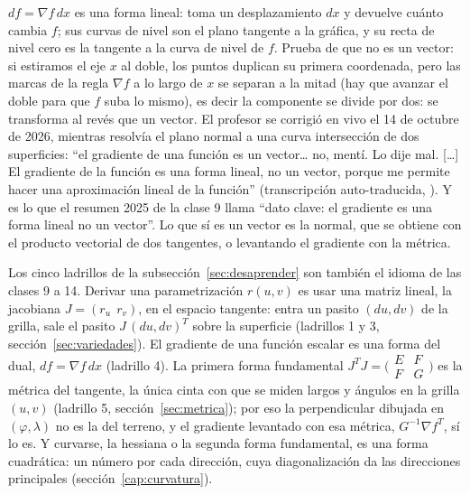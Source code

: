 \begin{atencion}
\(df=\nabla f\,dx\) es una forma lineal: toma un desplazamiento \(dx\) y devuelve cuánto
cambia \(f\); sus curvas de nivel son el plano tangente a la gráfica, y su recta de nivel
cero es la tangente a la curva de nivel de \(f\). Prueba de que no es un vector: si
estiramos el eje \(x\) al doble, los puntos duplican su primera coordenada, pero las marcas
de la regla \(\nabla f\) a lo largo de \(x\) se separan a la mitad (hay que avanzar el
doble para que \(f\) suba lo mismo), es decir la componente se divide por dos: se
transforma al revés que un vector. El profesor se corrigió en vivo el 14 de octubre de
2026, mientras resolvía el plano normal a una curva intersección de dos superficies: ``el
gradiente de una función es un vector\ldots{} no, mentí. Lo dije mal. [\ldots] El gradiente
de la función es una forma lineal, no un vector, porque me permite hacer una aproximación
lineal de la función'' (transcripción auto-traducida, ).
Y es lo que el resumen 2025 de la clase 9 llama ``dato clave: el gradiente es una forma
lineal no un vector''. Lo que sí es un vector es la normal, que se obtiene con el producto
vectorial de dos tangentes, o levantando el gradiente con la métrica.
\end{atencion}

\begin{resultado}
Los cinco ladrillos de la subsección~\ref{sec:desaprender} son también el idioma de las
clases 9 a 14. Derivar una parametrización \(r(u,v)\) es usar una matriz lineal, la
jacobiana \(J=(r_u\ \ r_v)\), en el espacio tangente: entra un pasito \((du,dv)\) de la
grilla, sale el pasito \(J\,(du,dv)^T\) sobre la superficie (ladrillos 1 y 3,
sección~\ref{sec:variedades}). El gradiente de una función escalar es una forma del dual,
\(df=\nabla f\,dx\) (ladrillo 4). La primera forma fundamental \(J^TJ=
\bigl(\begin{smallmatrix}E&F\\ F&G\end{smallmatrix}\bigr)\) es la métrica del tangente,
la única cinta con que se miden largos y ángulos en la grilla \((u,v)\) (ladrillo 5,
sección~\ref{sec:metrica}); por eso la perpendicular dibujada en \((\varphi,\lambda)\) no
es la del terreno, y el gradiente levantado con esa métrica, \(G^{-1}\nabla f^{T}\), sí lo
es. Y curvarse, la hessiana o la segunda forma fundamental, es una forma cuadrática: un
número por cada dirección, cuya diagonalización da las direcciones principales
(sección~\ref{cap:curvatura}).
\end{resultado}
